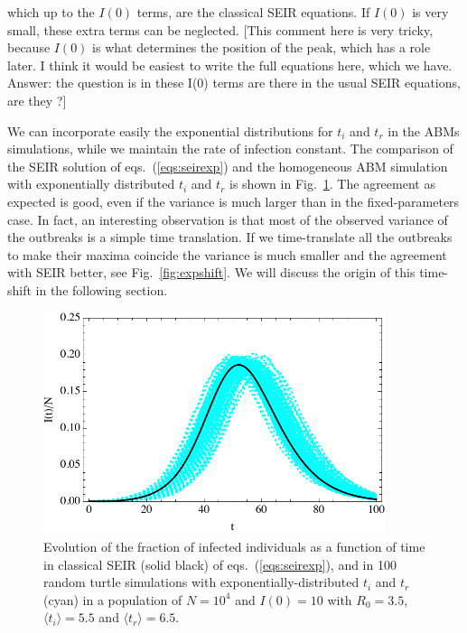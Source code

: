 \documentclass[a4paper,oneside,11pt]{article}
\newcommand{\mycomment}[1]{\textcolor[rgb]{0.75,0,0}{[#1]}}
\begin{document}
which up to the $I(0)$ terms, are the classical SEIR equations. If $I(0)$ is very small, these extra terms can  be neglected. \mycomment{This comment here is very tricky, because $I(0)$ is what determines the position of the peak,
which has a role later. I think it would be easiest to write the full equations here, which we have. Answer: the question is in these I(0) terms are there in the usual SEIR equations, are they ?}

We can incorporate easily  the exponential distributions for $t_i$ and $t_r$ in the ABMs simulations, while we maintain the rate of infection constant. 
The comparison of the SEIR solution of eqs.~(\ref{eqs:seirexp}) and the homogeneous ABM simulation with exponentially distributed $t_i$ and $t_r$ is shown in Fig.~\ref{fig:exp}. The agreement as expected is good, even if the variance is much larger than in the fixed-parameters case. In fact, an interesting observation is that most of the observed variance 
of the outbreaks is a simple time translation. If we time-translate all the outbreaks to make their maxima coincide the variance is much smaller and the agreement with SEIR better, see Fig.~\ref{fig:expshift}. We will discuss the origin of this time-shift in the following section. 
\begin{figure}[h!]
  \centering
  \includegraphics[width=10cm]{exp.pdf}
  \caption{ Evolution of the fraction of infected individuals as a function of time in classical SEIR (solid black) of eqs.~(\ref{eqs:seirexp}), and in 100 random turtle simulations with exponentially-distributed
  $t_i$ and $t_r$ (cyan) in a  population of $N=10^4$ and $I(0)=10$ with $R_0=3.5$, $\langle t_i\rangle=5.5$ and $\langle t_r\rangle=6.5$.  }
  \label{fig:exp}
   \end{figure}
   
\end{document}
